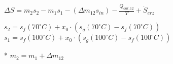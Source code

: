 \( \Delta S = m_2 s_2 - m_1 s_1 - (\Delta m_{12} s_{in}) - \frac{Q_{out,12}}{T} + \dot{S}_{erz} \)  

\( s_2 = s_f(70^\circ C) + x_0 \cdot (s_g(70^\circ C) - s_f(70^\circ C)) \)  
\( s_1 = s_f(100^\circ C) + x_0 \cdot (s_g(100^\circ C) - s_f(100^\circ C)) \)  

* \( m_2 = m_1 + \Delta m_{12} \)